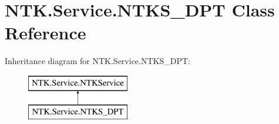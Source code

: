 \hypertarget{class_n_t_k_1_1_service_1_1_n_t_k_s___d_p_t}{}\section{N\+T\+K.\+Service.\+N\+T\+K\+S\+\_\+\+D\+PT Class Reference}
\label{class_n_t_k_1_1_service_1_1_n_t_k_s___d_p_t}
Inheritance diagram for N\+T\+K.\+Service.\+N\+T\+K\+S\+\_\+\+D\+PT\+:\begin{figure}[H]
\begin{center}
\leavevmode
\includegraphics[height=2.000000cm]{df/d47/class_n_t_k_1_1_service_1_1_n_t_k_s___d_p_t}
\end{center}
\end{figure}
